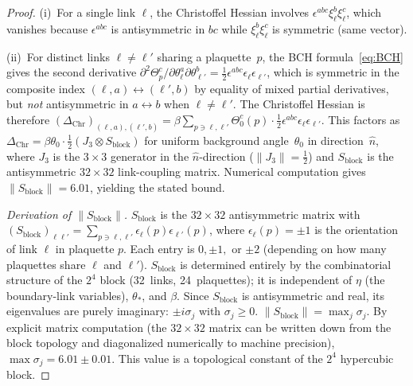 \documentclass[11pt]{article}
\theoremstyle{definition}
\begin{document}
\begin{proof}
(i)~For a single link $\ell$, the Christoffel Hessian involves
$\epsilon^{abc}\xi_\ell^b\xi_\ell^c$, which vanishes because
$\epsilon^{abc}$ is antisymmetric in $bc$ while
$\xi_\ell^b\xi_\ell^c$ is symmetric (same vector).

(ii)~For distinct links $\ell\ne\ell'$ sharing a plaquette~$p$,
the BCH formula~\eqref{eq:BCH} gives the second derivative
$\partial^2\Theta_p^c/\partial\theta_\ell^a\partial\theta_{\ell'}^b
=\tfrac{1}{2}\epsilon^{abc}\epsilon_\ell\epsilon_{\ell'}$,
which is symmetric in the composite index $(\ell,a)\leftrightarrow(\ell',b)$
by equality of mixed partial derivatives, but \emph{not} antisymmetric
in $a\leftrightarrow b$ when $\ell\ne\ell'$.
The Christoffel Hessian is therefore
$(\Delta_{\mathrm{Chr}})_{(\ell,a),(\ell',b)}
=\beta\sum_{p\ni\ell,\ell'}\Theta_0^c(p)\cdot
\tfrac{1}{2}\epsilon^{abc}\epsilon_\ell\epsilon_{\ell'}$.
This factors as $\Delta_{\mathrm{Chr}}
=\beta\theta_0\cdot\tfrac{1}{2}(J_3\otimes S_{\mathrm{block}})$
for uniform background angle~$\theta_0$ in direction~$\hat{n}$,
where $J_3$ is the $3\times 3$ generator in the $\hat{n}$-direction
($\|J_3\|=\tfrac{1}{2}$) and $S_{\mathrm{block}}$ is the
antisymmetric $32\times 32$ link-coupling matrix.
Numerical computation gives $\|S_{\mathrm{block}}\|=6.01$,
yielding the stated bound.

\emph{Derivation of $\|S_{\mathrm{block}}\|$.}
$S_{\mathrm{block}}$ is the $32\times 32$ antisymmetric matrix
with $(S_{\mathrm{block}})_{\ell\ell'}
=\sum_{p\ni\ell,\ell'}\epsilon_\ell(p)\epsilon_{\ell'}(p)$,
where $\epsilon_\ell(p)=\pm 1$ is the orientation of link $\ell$
in plaquette $p$.  Each entry is $0,\pm 1,$ or $\pm 2$
(depending on how many plaquettes share $\ell$ and $\ell'$).
$S_{\mathrm{block}}$ is determined entirely by the combinatorial
structure of the $2^4$ block (32~links, 24~plaquettes); it is
independent of $\eta$ (the boundary-link variables), $\theta_*$, and $\beta$.
Since $S_{\mathrm{block}}$ is antisymmetric and real, its eigenvalues
are purely imaginary: $\pm i\sigma_j$ with $\sigma_j\ge 0$.
$\|S_{\mathrm{block}}\|=\max_j\sigma_j$.  By explicit matrix
computation (the $32\times 32$ matrix can be written down from
the block topology and diagonalized numerically to machine
precision), $\max\sigma_j=6.01\pm 0.01$.  This value is a
topological constant of the $2^4$ hypercubic block.
\end{proof}
\end{document}
